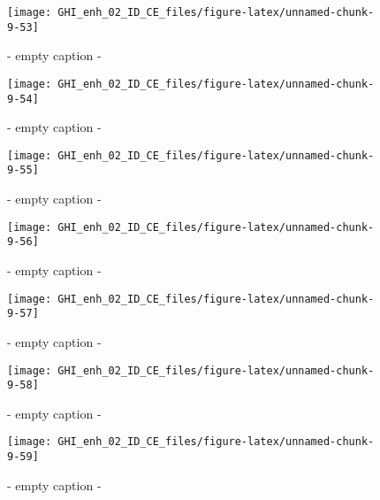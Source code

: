 \documentclass[
  10pt,
  a4paper,oneside]{article}
\begin{document}
\begin{figure}[H]

{\centering \texttt{[image: GHI\_enh\_02\_ID\_CE\_files/figure-latex/unnamed-chunk-9-53]} 

}

\caption{ - empty caption - }\label{fig:unnamed-chunk-9-53}
\end{figure}
\begin{figure}[H]

{\centering \texttt{[image: GHI\_enh\_02\_ID\_CE\_files/figure-latex/unnamed-chunk-9-54]} 

}

\caption{ - empty caption - }\label{fig:unnamed-chunk-9-54}
\end{figure}
\begin{figure}[H]

{\centering \texttt{[image: GHI\_enh\_02\_ID\_CE\_files/figure-latex/unnamed-chunk-9-55]} 

}

\caption{ - empty caption - }\label{fig:unnamed-chunk-9-55}
\end{figure}
\begin{figure}[H]

{\centering \texttt{[image: GHI\_enh\_02\_ID\_CE\_files/figure-latex/unnamed-chunk-9-56]} 

}

\caption{ - empty caption - }\label{fig:unnamed-chunk-9-56}
\end{figure}
\begin{figure}[H]

{\centering \texttt{[image: GHI\_enh\_02\_ID\_CE\_files/figure-latex/unnamed-chunk-9-57]} 

}

\caption{ - empty caption - }\label{fig:unnamed-chunk-9-57}
\end{figure}
\begin{figure}[H]

{\centering \texttt{[image: GHI\_enh\_02\_ID\_CE\_files/figure-latex/unnamed-chunk-9-58]} 

}

\caption{ - empty caption - }\label{fig:unnamed-chunk-9-58}
\end{figure}
\begin{figure}[H]

{\centering \texttt{[image: GHI\_enh\_02\_ID\_CE\_files/figure-latex/unnamed-chunk-9-59]} 

}

\caption{ - empty caption - }\label{fig:unnamed-chunk-9-59}
\end{figure}
\end{document}
